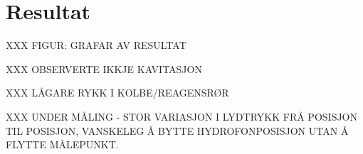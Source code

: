 \section{Resultat}
XXX FIGUR: GRAFAR AV RESULTAT

XXX OBSERVERTE IKKJE KAVITASJON

XXX LÅGARE RYKK I KOLBE/REAGENSRØR

XXX UNDER MÅLING - STOR VARIASJON I LYDTRYKK FRÅ POSISJON TIL POSISJON, VANSKELEG Å BYTTE HYDROFONPOSISJON UTAN Å FLYTTE MÅLEPUNKT.

